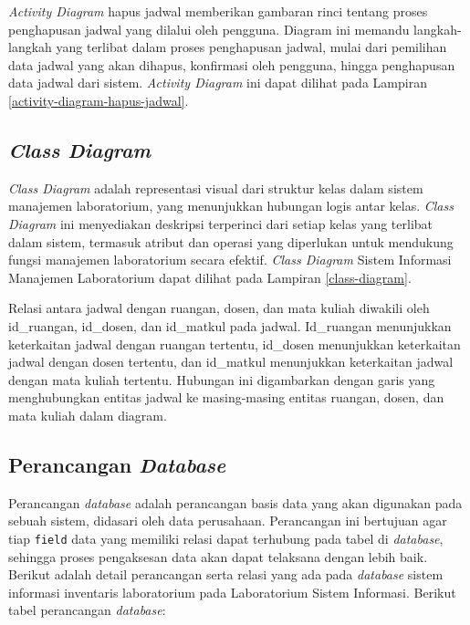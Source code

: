 \textit{Activity Diagram} hapus jadwal memberikan gambaran rinci tentang proses penghapusan jadwal yang dilalui oleh pengguna. Diagram ini memandu langkah-langkah yang terlibat dalam proses penghapusan jadwal, mulai dari pemilihan data jadwal yang akan dihapus, konfirmasi oleh pengguna, hingga penghapusan data jadwal dari sistem. \textit{Activity Diagram} ini dapat dilihat pada Lampiran \ref{activity-diagram-hapus-jadwal}.


\subsection{\textit{Class Diagram}}
\textit{Class Diagram} adalah representasi visual dari struktur kelas dalam sistem manajemen laboratorium, yang menunjukkan hubungan logis antar kelas. \textit{Class Diagram} ini menyediakan deskripsi terperinci dari setiap kelas yang terlibat dalam sistem, termasuk atribut dan operasi yang diperlukan untuk mendukung fungsi manajemen laboratorium secara efektif. \textit{Class Diagram} Sistem Informasi Manajemen Laboratorium dapat dilihat pada Lampiran \ref{class-diagram}.

Relasi antara jadwal dengan ruangan, dosen, dan mata kuliah diwakili oleh id\_ruangan, id\_dosen, dan id\_matkul pada jadwal. Id\_ruangan menunjukkan keterkaitan jadwal dengan ruangan tertentu, id\_dosen menunjukkan keterkaitan jadwal dengan dosen tertentu, dan id\_matkul menunjukkan keterkaitan jadwal dengan mata kuliah tertentu. Hubungan ini digambarkan dengan garis yang menghubungkan entitas jadwal ke masing-masing entitas ruangan, dosen, dan mata kuliah dalam diagram.

\subsection{Perancangan \textit{Database}}
Perancangan \textit{database} adalah perancangan basis data yang akan digunakan pada sebuah sistem, didasari oleh data perusahaan. Perancangan ini bertujuan agar tiap \texttt{field} data yang memiliki relasi dapat terhubung pada tabel di \textit{database}, sehingga proses pengaksesan data akan dapat telaksana dengan lebih baik. Berikut adalah detail perancangan serta relasi yang ada pada \textit{database} sistem informasi inventaris laboratorium pada Laboratorium Sistem Informasi. Berikut tabel perancangan \textit{database}:


